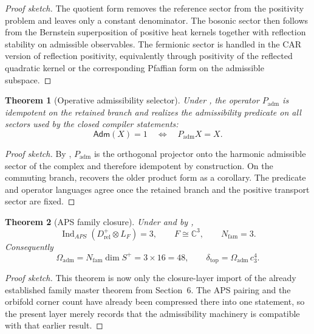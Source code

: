 \documentclass[11pt,a4paper]{article}
\newtheorem{theorem}{Theorem}[section]
\theoremstyle{definition}
\theoremstyle{remark}
\DeclareMathOperator{\Ind}{Ind}
\newcommand{\cthree}{c_3}
\newcommand{\deltatop}{\delta_{\mathrm{top}}}
\newcommand{\Oadm}{\Omega_{\mathrm{adm}}}
\newcommand{\Padm}{P_{\mathrm{adm}}}
\begin{document}
\begin{proof}[Proof sketch]
The quotient form  removes the reference sector from the positivity problem and leaves only a constant denominator. The bosonic sector then follows from the Bernstein superposition of positive heat kernels together with reflection stability on admissible observables. The fermionic sector is handled in the CAR version of reflection positivity, equivalently through positivity of the reflected quadratic kernel or the corresponding Pfaffian form on the admissible subspace.
\end{proof}

\begin{theorem}[Operative admissibility selector]
Under , the operator $\Padm$ is idempotent on the retained branch and realizes the admissibility predicate on all sectors used by the closed compiler statements:
\[
\mathsf{Adm}(X)=1
\quad\Longleftrightarrow\quad
\Padm X = X.
\]
\end{theorem}

\begin{proof}[Proof sketch]
By , $\Padm$ is the orthogonal projector onto the harmonic admissible sector of the complex and therefore idempotent by construction. On the commuting branch,  recovers the older product form as a corollary. The predicate and operator languages agree once the retained branch and the positive transport sector are fixed.
\end{proof}

\begin{theorem}[APS family closure]
Under  and by ,
\[
\Ind_{APS}(D^+_{\mathrm{rel}}\otimes L_F)=3,
\qquad
F\cong\mathbb C^3,
\qquad
N_{\mathrm{fam}}=3.
\]
Consequently
\[
\Oadm=N_{\mathrm{fam}}\dim S^+=3\times 16=48,
\qquad
\deltatop=\Oadm\,\cthree^4.
\]
\end{theorem}

\begin{proof}[Proof sketch]
This theorem is now only the closure-layer import of the already established family master theorem from Section~6. The APS pairing and the orbifold corner count have already been compressed there into one statement, so the present layer merely records that the admissibility machinery is compatible with that earlier result.
\end{proof}
\end{document}
